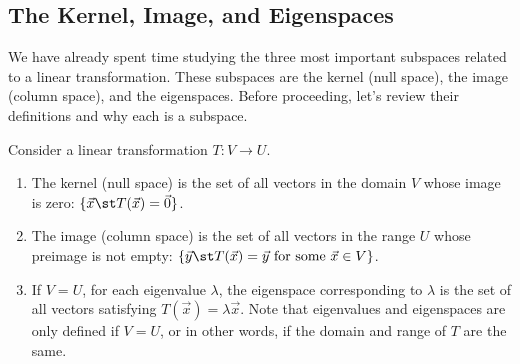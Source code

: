 \subsection{The Kernel, Image, and Eigenspaces}
We have already spent time studying the three most important subspaces related to a linear transformation. These subspaces are the kernel (null space), the image (column space), and the eigenspaces. Before proceeding, let's review their definitions and why each is a subspace.
\begin{definition} Consider a linear transformation $T\colon V\to U$.
\begin{enumerate}
	\item The kernel (null space) is the set of all vectors in the domain $V$ whose image is zero: $\{\vec x \st T(\vec x)=\vec 0\}$.
	\item The image (column space) is the set of all vectors in the range $U$ whose preimage is not empty: $\{\vec y \st T(\vec x)=\vec y \text{ for some }\vec x \in V\}$.
	\item If $V=U$, for each eigenvalue $\lambda$, the eigenspace corresponding to $\lambda$ is the set of all vectors satisfying $T(\vec x) = \lambda\vec x$.  Note that eigenvalues and eigenspaces are only defined if $V=U$, or in other words, if the domain and range of $T$ are the same.
\end{enumerate}
\end{definition}

